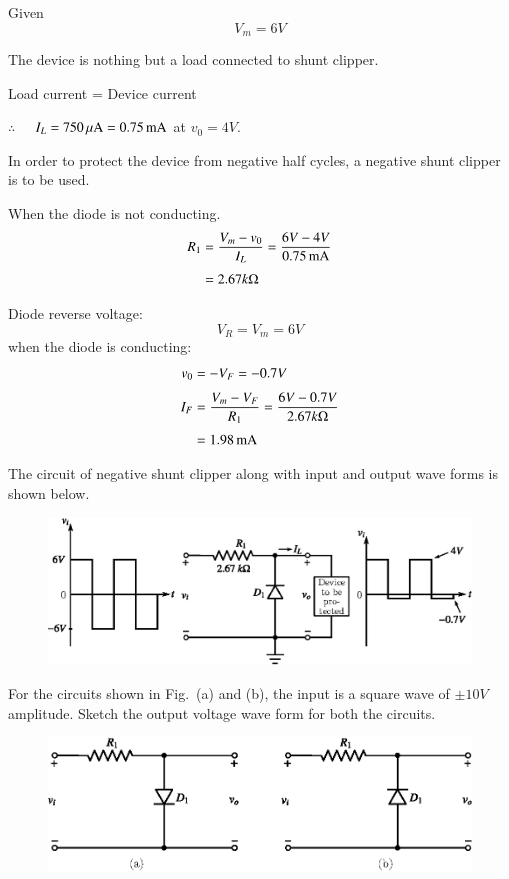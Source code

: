 \begin{solution}
Given
$$
V_{m}=6V
$$

The device is nothing but a load connected to shunt clipper.

Load current = Device current

$\therefore$~~ $I_{L}=750\,\mu\text{A}=0.75\operatorname{mA}$ at $v_{0}=4V$.

In order to protect the device from negative half cycles, a negative shunt clipper is to be used.

When the diode is not conducting.
\begin{align*}
R_{1} &= \frac{V_{m}-v_{0}}{I_{L}}=\frac{6V-4V}{0.75\operatorname{mA}}\\[3pt]
&= 2.67k\Omega
\end{align*}

Diode reverse voltage:
$$
V_{R}=V_{m}=6V
$$
when the diode is conducting:
\begin{align*}
v_{0} &= -V_{F}=-0.7V\\[3pt]
I_{F} &= \frac{V_{m}-V_{F}}{R_{1}}=\frac{6V-0.7V}{2.67k\Omega}\\[3pt]
&= 1.98\operatorname{mA}
\end{align*}

The circuit of negative shunt clipper along with input and output wave forms is shown below.
\begin{figure}[H]
\centering
\includegraphics{chap2/sol2.42.eps}
\end{figure}
\end{solution}

\begin{example}\label{exam2.43}
For the circuits shown in Fig.~(a) and (b), the input is a square wave of $\pm 10V$ amplitude. Sketch the output voltage wave form for both the circuits.
\begin{figure}[H]
\centering
\includegraphics{chap2/exp2.43.eps}
\end{figure}
\end{example}

